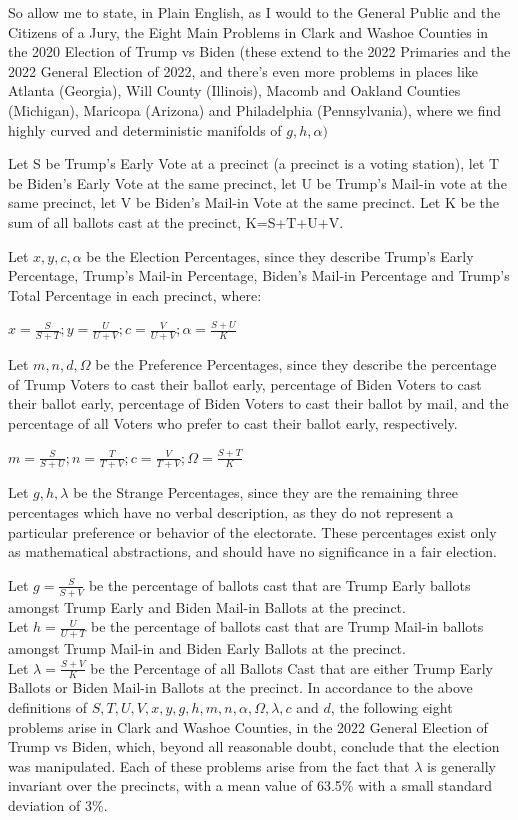 \documentclass[preprint,13pt]{elsarticle}
\begin{document}
So allow me to state, in Plain English, as I would to the General Public and the Citizens of a Jury, the Eight Main Problems in Clark and Washoe Counties in the 2020 Election of Trump vs Biden (these extend to the 2022 Primaries and the 2022 General Election of 2022, and there's even more problems in places like Atlanta (Georgia), Will County (Illinois), Macomb and Oakland Counties (Michigan), Maricopa (Arizona) and Philadelphia (Pennsylvania), where we find highly curved and deterministic manifolds of $g,h,\alpha)$

Let S be Trump's Early Vote at a precinct (a precinct is a voting station), let T be Biden's Early Vote at the same precinct, let U be Trump's Mail-in vote at the same precinct, let V be Biden's Mail-in Vote at the same precinct. Let K be the sum of all ballots cast at the precinct, K=S+T+U+V.

Let $x,y,c,\alpha$ be the Election Percentages, since they describe Trump's Early Percentage, Trump's Mail-in Percentage, Biden's Mail-in Percentage and Trump's Total Percentage in each precinct, where:

$x=\frac{S}{S+T}; y=\frac{U}{U+V}; c=\frac{V}{U+V}; \alpha=\frac{S+U}{K}$

Let $m,n,d,\Omega$ be the Preference Percentages, since they describe the percentage of Trump Voters to cast their ballot early, percentage of Biden Voters to cast their ballot early, percentage of Biden Voters to cast their ballot by mail, and the percentage of all Voters who prefer to cast their ballot early, respectively.

$m=\frac{S}{S+U}; n=\frac{T}{T+V}; c=\frac{V}{T+V}; \Omega=\frac{S+T}{K}$

Let $g,h,\lambda$ be the Strange Percentages, since they are the remaining three percentages which have no verbal description, as they do not represent a particular preference or behavior of the electorate. These percentages exist only as mathematical abstractions, and should have no significance in a fair election.

Let $g=\frac{S}{S+V}$ be the percentage of ballots cast that are Trump Early ballots amongst Trump Early and Biden Mail-in Ballots at the precinct.\\
Let $h=\frac{U}{U+T}$  be the percentage of ballots cast that are Trump Mail-in ballots amongst Trump Mail-in and Biden Early Ballots at the precinct.\\
Let $\lambda=\frac{S+V}{K}$ be the Percentage of all Ballots Cast that are either Trump Early Ballots or Biden Mail-in Ballots at the precinct.
\newpage
In accordance to the above definitions of $S,T,U,V,x,y,g,h,m,n,\alpha,\Omega,\lambda,c$ and $d$, the following eight problems arise in Clark and Washoe Counties, in the 2022 General Election of Trump vs Biden, which, beyond all reasonable doubt, conclude that the election was manipulated. Each of these problems arise from the fact that $\lambda$ is generally invariant over the precincts, with a mean value of 63.5\% with a small standard deviation of 3\%.
\end{document}
